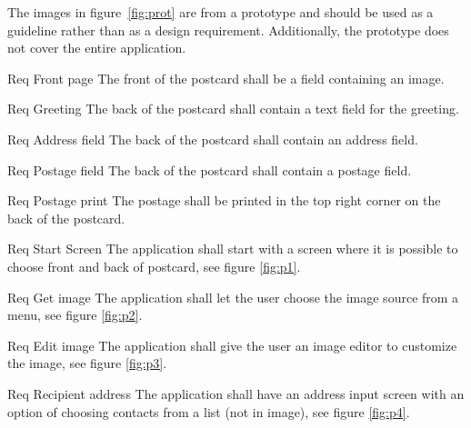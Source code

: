 \documentclass[10pt,a4paper]{article}
\begin{document}
The images in figure~\ref{fig:prot} are from a prototype and should be used as a guideline rather than as a design requirement. Additionally, the prototype does not cover the entire application.

\begin {description}
	\item [Req \thesubsubsection {.\thedesign} Front page] The front of the postcard shall be a field containing an image.
	\item [Req \thesubsubsection {.\thedesign} Greeting] The back of the postcard shall contain a text field for the greeting.
	\item [Req \thesubsubsection {.\thedesign} Address field] The back of the postcard shall contain an address field.
	\item [Req \thesubsubsection {.\thedesign} Postage field] The back of the postcard shall contain a postage field. 
	\item [Req \thesubsubsection {.\thedesign} Postage print] The postage shall be printed in the top right corner on the back of the postcard. 
	\item [Req \thesubsubsection {.\thedesign} Start Screen] The application shall start with a screen where it is possible to choose front and back of postcard, see figure \ref{fig:p1}.
	\item [Req \thesubsubsection {.\thedesign} Get image] The application shall let the user choose the image source from a menu, see figure \ref{fig:p2}.
	\item [Req \thesubsubsection {.\thedesign} Edit image] The application shall give the user an image editor to customize the image, see figure \ref{fig:p3}.
	\item [Req \thesubsubsection {.\thedesign} Recipient address] The application shall have an address input screen with an option of choosing contacts from a list (not in image), see figure \ref{fig:p4}.
\end{description}
\end{document}
